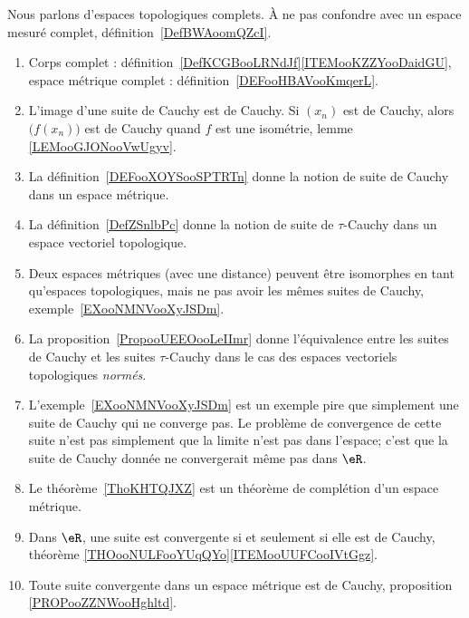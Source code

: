 
     \label{THMooOCXTooWenIJE}

Nous parlons d'espaces topologiques complets. À ne pas confondre avec un espace mesuré complet, définition~\ref{DefBWAoomQZcI}.

\begin{enumerate}
	\item
	      Corps complet : définition~\ref{DefKCGBooLRNdJf}\ref{ITEMooKZZYooDaidGU}, espace métrique complet : définition~\ref{DEFooHBAVooKmqerL}.
      \item
          L'image d'une suite de Cauchy est de Cauchy. Si \( (x_n)\) est de Cauchy, alors \( \big( f(x_n) \big)\) est de Cauchy quand \( f\) est une isométrie, lemme \ref{LEMooGJONooVwUgyv}.
	\item
	      La définition~\ref{DEFooXOYSooSPTRTn} donne la notion de suite de Cauchy dans un espace métrique.
	\item
	      La définition~\ref{DefZSnlbPc} donne la notion de suite de \( \tau\)-Cauchy dans un espace vectoriel topologique.
	\item
	      Deux espaces métriques (avec une distance) peuvent être isomorphes en tant qu'espaces topologiques, mais ne pas avoir les mêmes suites de Cauchy, exemple~\ref{EXooNMNVooXyJSDm}.
	\item
	      La proposition~\ref{PropooUEEOooLeIImr} donne l'équivalence entre les suites de Cauchy et les suites \( \tau\)-Cauchy dans le cas des espaces vectoriels topologiques \emph{normés}.
	\item
	      L'exemple~\ref{EXooNMNVooXyJSDm} est un exemple pire que simplement une suite de Cauchy qui ne converge pas. Le problème de convergence de cette suite n'est pas simplement que la limite n'est pas dans l'espace; c'est que la suite de Cauchy donnée ne convergerait même pas dans \( \eR\).
	\item
	      Le théorème~\ref{ThoKHTQJXZ} est un théorème de complétion d'un espace métrique.
	\item
	      Dans \( \eR\), une suite est convergente si et seulement si elle est de Cauchy, théorème \ref{THOooNULFooYUqQYo}\ref{ITEMooUUFCooIVtGgz}.
	\item
	      Toute suite convergente dans un espace métrique est de Cauchy, proposition \ref{PROPooZZNWooHghltd}.
\end{enumerate}

